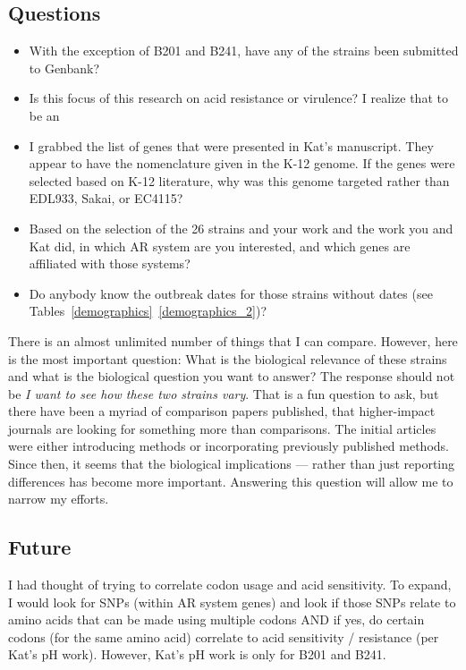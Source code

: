 \documentclass[11pt]{article}
\begin{document}
\subsection*{Questions}
\begin{itemize}
\item With the exception of B201 and B241, have any of the strains been submitted to Genbank?
\item Is this focus of this research on acid resistance or virulence? I realize that to be an 
\item I grabbed the list of genes that were presented in Kat's manuscript. They appear to have the nomenclature given in the K-12 genome. If the genes were selected based on K-12 literature, why was this genome targeted rather than EDL933, Sakai, or EC4115? 
\item Based on the selection of the 26 strains and your work and the work you and Kat did, in which AR system are you interested, and which genes are affiliated with those systems?
\item Do anybody know the outbreak dates for those strains without dates (see Tables~\ref{demographics}~\ref{demographics_2})?

\end{itemize}

There is an almost unlimited number of things that I can compare. However, here is the most important question: What is the biological relevance of these strains and what is the biological question you want to answer? The response should not be \textit{I want to see how these two strains vary}. That is a fun question to ask, but there have been a myriad of comparison papers published, that higher-impact journals are looking for something more than comparisons. The initial articles were either introducing methods or incorporating previously published methods. Since then, it seems that the biological implications --- rather than just reporting differences has become more important. Answering this question will allow me to narrow my efforts.

\subsection*{Future}
I had thought of trying to correlate codon usage and acid sensitivity. To expand, I would look for SNPs (within AR system genes) and look if those SNPs relate to amino acids that can be made using multiple codons AND if yes, do certain codons (for the same amino acid) correlate to acid sensitivity / resistance (per Kat's pH work). However, Kat's pH work is only for B201 and B241. 
\clearpage
\end{document}
